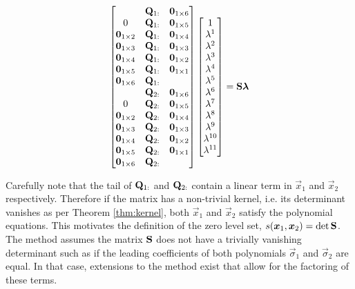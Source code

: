 \documentclass[oneside, 11pt]{book}
\begin{document}
\begin{equation}
    \begin{bmatrix}
        & \mathbf{Q}_{1:} & \bm{0}_{1\times 6} \\
        0 & \mathbf{Q}_{1:} & \bm{0}_{1\times 5} \\
        \bm{0}_{1\times 2} & \mathbf{Q}_{1:} & \bm{0}_{1\times 4} \\
        \bm{0}_{1\times 3} & \mathbf{Q}_{1:} & \bm{0}_{1\times 3} \\
        \bm{0}_{1\times 4} & \mathbf{Q}_{1:} & \bm{0}_{1\times 2} \\
        \bm{0}_{1\times 5} & \mathbf{Q}_{1:} & \bm{0}_{1\times 1} \\
        \bm{0}_{1\times 6} & \mathbf{Q}_{1:} & \\
        & \mathbf{Q}_{2:} & \bm{0}_{1\times 6} \\
        0 & \mathbf{Q}_{2:} & \bm{0}_{1\times 5} \\
        \bm{0}_{1\times 2} & \mathbf{Q}_{2:} & \bm{0}_{1\times 4} \\
        \bm{0}_{1\times 3} & \mathbf{Q}_{2:} & \bm{0}_{1\times 3} \\
        \bm{0}_{1\times 4} & \mathbf{Q}_{2:} & \bm{0}_{1\times 2} \\
        \bm{0}_{1\times 5} & \mathbf{Q}_{2:} & \bm{0}_{1\times 1} \\
        \bm{0}_{1\times 6} & \mathbf{Q}_{2:} & \\
    \end{bmatrix}
    \begin{bmatrix}
        1 \\
        \lambda^1 \\
        \lambda^2 \\
        \lambda^3 \\
        \lambda^4 \\
        \lambda^5 \\
        \lambda^6 \\
        \lambda^7 \\
        \lambda^8 \\
        \lambda^9 \\
        \lambda^{10} \\
        \lambda^{11}
    \end{bmatrix}
    =
    \mathbf{S}\bm{\lambda}
    \label{eqn:inhomog_poly}
\end{equation}

Carefully note that the tail of $\mathbf{Q}_{1:}$ and $\mathbf{Q}_{2:}$ contain a linear term in $\vec{x}_1$ and $\vec{x}_2$ respectively. Therefore if the matrix has a non-trivial kernel, i.e. its determinant vanishes as per Theorem \ref{thm:kernel}, both $\vec{x}_1$ and $\vec{x}_2$ satisfy the polynomial equations. This motivates the definition of the zero level set, $s(\bm{x}_1, \bm{x}_2) = \det\mathbf{S}$. The method assumes the matrix $\mathbf{S}$ does not have a trivially vanishing determinant such as if the leading coefficients of both polynomials $\vec{\sigma}_1$ and $\vec{\sigma}_2$ are equal. In that case, extensions to the method exist that allow for the factoring of these terms\cite{Sederberg84}.
\end{document}
